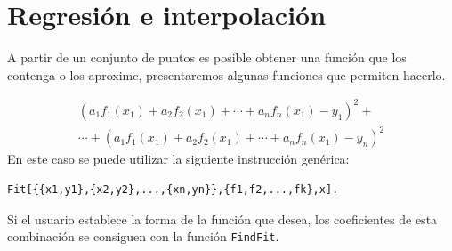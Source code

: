      \section{Regresión e interpolación}
      A partir de un conjunto de puntos es posible obtener una función
      que los contenga o los aproxime, presentaremos algunas funciones que permiten hacerlo.

      \begin{multline*}
        \left( a_{1}f_{1}\left( x_{1}\right) +a_{2}f_{2}\left( x_{1}\right)
        +\cdots +a_{n}f_{n}\left( x_{1}\right) -y_{1}\right) ^{2}+ \\
        \cdots +\left(a_{1}f_{1}\left( x_{1}\right) +a_{2}f_{2}\left( x_{1}\right) +
        \cdots +a_{n}f_{n}\left( x_{1}\right) -y_{n}\right) ^{2}
      \end{multline*}
      En este caso se puede utilizar la siguiente instrucción genérica:
      \begin{tcolorbox}[title=Ajuste de puntos]
\begin{Verbatim}[formatcom=\letraverbatim]
Fit[{{x1,y1},{x2,y2},...,{xn,yn}},{f1,f2,...,fk},x].
\end{Verbatim}
      \end{tcolorbox}
      Si el usuario establece la forma de la función que desea, los coeficientes de esta combinación
      se consiguen con la función \verb"FindFit".  

